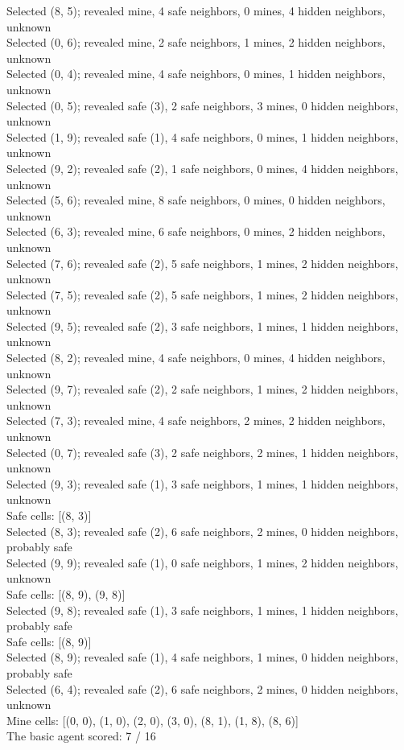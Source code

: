 \documentclass[11pt]{article} %
\begin{document}
Selected (8, 5); revealed mine, 4 safe neighbors, 0 mines, 4 hidden neighbors, unknown\\
Selected (0, 6); revealed mine, 2 safe neighbors, 1 mines, 2 hidden neighbors, unknown\\
Selected (0, 4); revealed mine, 4 safe neighbors, 0 mines, 1 hidden neighbors, unknown\\
Selected (0, 5); revealed safe (3), 2 safe neighbors, 3 mines, 0 hidden neighbors, unknown\\
Selected (1, 9); revealed safe (1), 4 safe neighbors, 0 mines, 1 hidden neighbors, unknown\\
Selected (9, 2); revealed safe (2), 1 safe neighbors, 0 mines, 4 hidden neighbors, unknown\\
Selected (5, 6); revealed mine, 8 safe neighbors, 0 mines, 0 hidden neighbors, unknown\\
Selected (6, 3); revealed mine, 6 safe neighbors, 0 mines, 2 hidden neighbors, unknown\\
Selected (7, 6); revealed safe (2), 5 safe neighbors, 1 mines, 2 hidden neighbors, unknown\\
Selected (7, 5); revealed safe (2), 5 safe neighbors, 1 mines, 2 hidden neighbors, unknown\\
Selected (9, 5); revealed safe (2), 3 safe neighbors, 1 mines, 1 hidden neighbors, unknown\\
Selected (8, 2); revealed mine, 4 safe neighbors, 0 mines, 4 hidden neighbors, unknown\\
Selected (9, 7); revealed safe (2), 2 safe neighbors, 1 mines, 2 hidden neighbors, unknown\\
Selected (7, 3); revealed mine, 4 safe neighbors, 2 mines, 2 hidden neighbors, unknown\\
Selected (0, 7); revealed safe (3), 2 safe neighbors, 2 mines, 1 hidden neighbors, unknown\\
Selected (9, 3); revealed safe (1), 3 safe neighbors, 1 mines, 1 hidden neighbors, unknown\\
Safe cells: [(8, 3)]\\
Selected (8, 3); revealed safe (2), 6 safe neighbors, 2 mines, 0 hidden neighbors, probably safe\\
Selected (9, 9); revealed safe (1), 0 safe neighbors, 1 mines, 2 hidden neighbors, unknown\\
Safe cells: [(8, 9), (9, 8)]\\
Selected (9, 8); revealed safe (1), 3 safe neighbors, 1 mines, 1 hidden neighbors, probably safe\\
Safe cells: [(8, 9)]\\
Selected (8, 9); revealed safe (1), 4 safe neighbors, 1 mines, 0 hidden neighbors, probably safe\\
Selected (6, 4); revealed safe (2), 6 safe neighbors, 2 mines, 0 hidden neighbors, unknown\\
Mine cells: [(0, 0), (1, 0), (2, 0), (3, 0), (8, 1), (1, 8), (8, 6)]\\
The basic agent scored: 7 / 16\\
\end{document}
